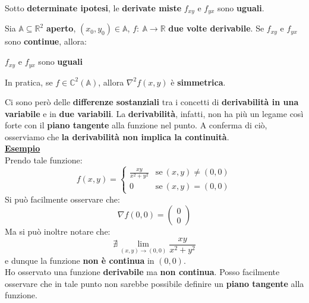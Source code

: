 \documentclass[a4paper, oneside]{article}
\newcommand\R{\mathbb{R}}
\newcommand\C{\mathbb{C}}
\newcommand\A{\mathbb{A}}
\begin{document}
    \noindent Sotto \textbf{determinate ipotesi}, le \textbf{derivate miste} $f_{xy}$ e $f_{yx}$ sono \textbf{uguali}.

    \begin{theorem}
        Sia $\A\subseteq\R^2$ \textbf{aperto}, $(x_0,y_0)\in\A$, $f: \ \A\to\R$ \textbf{due volte derivabile}. Se $f_{xy}$ e $f_{yx}$ sono \textbf{continue}, allora:
        \begin{center}
            $f_{xy}$ e $f_{yx}$ sono \textbf{uguali}
        \end{center}
        In pratica, se $f\in\C^2(\A)$, allora $\nabla^2f(x,y)$ è \textbf{simmetrica}.
    \end{theorem}

    \noindent Ci sono però delle \textbf{differenze sostanziali} tra i concetti di \textbf{derivabilità in una variabile} e in \textbf{due variabili}. 
    La \textbf{derivabilità}, infatti, non ha più un legame così forte con il \textbf{piano tangente} alla funzione nel punto. 
    A conferma di ciò, osserviamo che \textbf{la derivabilità non implica la continuità}.\\

    \noindent \textbf{\underline{Esempio}}\\
    Prendo tale funzione:
    \[f(x,y) = \begin{cases}
        \frac{xy}{x^2+y^2} & \text{se} \ (x,y) \ne (0,0) \\
        0 & \text{se} \ (x,y) = (0,0)
    \end{cases}\]
    Si può facilmente osservare che:
    \[\nabla f(0,0) = \begin{pmatrix}
        0 \\ 0
    \end{pmatrix}\]
    Ma si può inoltre notare che:
    \[\nexists \lim_{(x,y)\to (0,0)} \frac{xy}{x^2+y^2}\]
    e dunque la funzione \textbf{non è continua} in $(0,0)$.\\

    \noindent Ho osservato una funzione \textbf{derivabile} ma \textbf{non continua}. Posso facilmente osservare che in tale punto non sarebbe possibile
    definire un \textbf{piano tangente} alla funzione. 
    \begin{center}
    \end{center}
\end{document}
